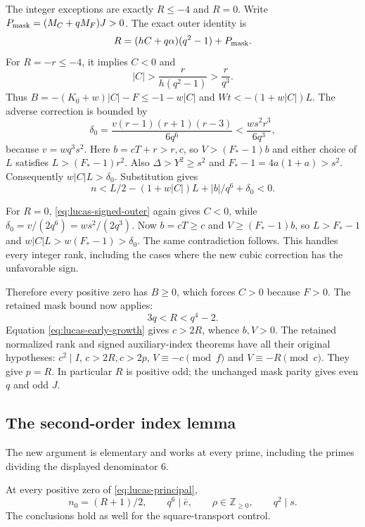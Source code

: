 The integer exceptions are exactly $R\le-4$ and $R=0$.  Write
$P_{\rm mask}=(M_C+qM_F)J>0$.  The exact outer identity is
\begin{equation}
 R=(hC+q\alpha)(q^2-1)+P_{\rm mask}.
 \label{eq:lucas-signed-outer}
\end{equation}
For $R=-r\le-4$, it implies $C<0$ and
\[
 |C|>\frac r{h(q^2-1)}>\frac r{q^3}.
\]
Thus $B=-(K_0+w)|C|-F\le-1-w|C|$ and
$Wt<-(1+w|C|)L$.  The adverse correction is bounded by
\begin{equation}
 \delta_0=\frac{v(r-1)(r+1)(r-3)}{6q^6}
          <\frac{ws^2r^3}{6q^3},
 \label{eq:lucas-adverse}
\end{equation}
because $v=wq^3s^2$.  Here $b=cT+r>r,c$, so
$V>(F_*-1)b$ and either choice of $L$ satisfies
$L>(F_*-1)r^2$.  Also $\Delta>Y^2\ge s^2$ and
$F_*-1=4a(1+a)>s^2$.  Consequently $w|C|L>\delta_0$.  Substitution gives
\[
 n<L/2-(1+w|C|)L+|b|/q^6+\delta_0<0.
\]

For $R=0$, \eqref{eq:lucas-signed-outer} again gives $C<0$, while
$\delta_0=v/(2q^6)=ws^2/(2q^3)$.  Now $b=cT\ge c$ and
$V\ge(F_*-1)b$, so $L>F_*-1$ and
$w|C|L>w(F_*-1)>\delta_0$.  The same contradiction follows.
This handles every integer rank, including the cases where the new cubic
correction has the unfavorable sign.

Therefore every positive zero has $B\ge0$, which forces $C>0$ because
$F>0$.  The retained mask bound now applies:
\begin{equation}
 3q<R<q^4-2.
 \label{eq:lucas-rank-box}
\end{equation}
Equation \eqref{eq:lucas-early-growth} gives $c>2R$, whence $b,V>0$.
The retained normalized rank and signed auxiliary-index theorems have all
their original hypotheses: $c^2\mid I$, $c>2R,c>2p$,
$V\equiv-c\pmod f$ and $V\equiv-R\pmod c$.  They give $p=R$.
In particular $R$ is positive odd; the unchanged mask parity gives even $q$
and odd $J$.

\subsection{The second-order index lemma}

The new argument is elementary and works at every prime, including the primes
dividing the displayed denominator $6$.

\begin{lemma}
\label{lem:lucas-corrected-index}
At every positive zero of \eqref{eq:lucas-principal},
\[
 n_0=(R+1)/2,\qquad q^6\mid\bar e,
 \qquad \rho\in\mathbb Z_{\ge0},\qquad q^2\mid s.
\]
The conclusions hold as well for the square-transport control.
\end{lemma}

